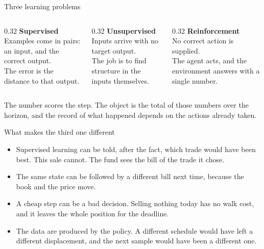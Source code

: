 \documentclass[aspectratio=169,10pt]{beamer}
\newcommand{\currentsource}{}
\newcommand{\framesource}[1]{\gdef\currentsource{#1}}
\begin{document}
\begin{frame}{Three learning problems}
\framesource{Sutton and Barto, 2018, \S 1.3}
\begin{columns}[T]
\begin{column}{0.32\textwidth}
\textbf{\color{navy}Supervised}\\[0.35em]
Examples come in pairs: an input, and the correct output.\\[0.4em]
The error is the distance to that output.
\end{column}
\begin{column}{0.32\textwidth}
\textbf{\color{navy}Unsupervised}\\[0.35em]
Inputs arrive with no target output.\\[0.4em]
The job is to find structure in the inputs themselves.
\end{column}
\begin{column}{0.32\textwidth}
\textbf{\color{navy}Reinforcement}\\[0.35em]
No correct action is supplied.\\[0.4em]
The agent acts, and the environment answers with a single number.
\end{column}
\end{columns}
\vspace{0.9em}
The number scores the step. The object is the total of those numbers over the horizon, and the record of what happened depends on the actions already taken.
\end{frame}

\begin{frame}{What makes the third one different}
\framesource{Sutton and Barto, 2018, \S 1.3}
\begin{itemize}
\item Supervised learning can be told, after the fact, which trade would have been best. This sale cannot. The fund sees the bill of the trade it chose.
\item The same state can be followed by a different bill next time, because the book and the price move.
\item A cheap step can be a bad decision. Selling nothing today has no walk cost, and it leaves the whole position for the deadline.
\item The data are produced by the policy. A different schedule would have left a different displacement, and the next sample would have been a different one.
\end{itemize}
\end{frame}
\end{document}
